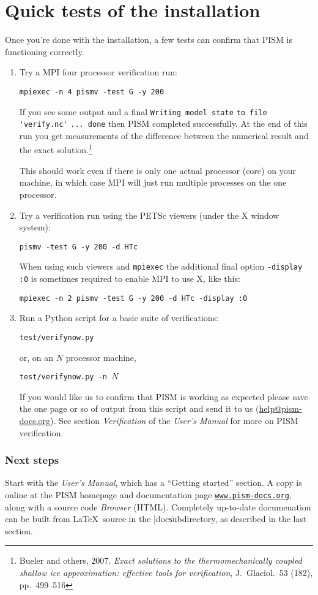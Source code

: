 \documentclass[11pt,final]{amsart}
\renewcommand{\t}[1]{\texttt{#1}}
\begin{document}
\clearpage
\section{Quick tests of the installation}
Once you're done with the installation, a few tests can confirm that PISM is functioning correctly.
\begin{enumerate}
\item Try a MPI four processor verification run:

\verb|mpiexec -n 4 pismv -test G -y 200|

\noindent If you see some output and a final \verb|Writing model state| \verb|to file 'verify.nc'| \verb|... done| then PISM
completed successfully.  At the end of this run you get measurements of the difference between the numerical result and
the exact solution.\footnote{Bueler and others, 2007.  \emph{Exact solutions to the thermomechanically coupled shallow ice approximation: effective tools for verification}, J.~Glaciol.~53 (182), pp.~499--516}

\noindent This should work even if there is only one actual processor (core) on your machine, in which case MPI will just run multiple processes on the one processor.

\item Try a verification run using the PETSc viewers (under the X window system):

\verb|pismv -test G -y 200 -d HTc|

\noindent When using such viewers and \verb|mpiexec| the additional final option \verb|-display :0| is sometimes required to enable MPI to use X, like this:

\verb|mpiexec -n 2 pismv -test G -y 200 -d HTc -display :0|

\item Run a Python script for a basic suite of verifications:

\verb|test/verifynow.py|

\noindent or, on an $N$ processor machine,

\verb|test/verifynow.py -n |$N$

\noindent If you would like us to confirm that PISM is working as expected please save the one page or so of output from this script and send it to us (\href{mailto:help@pism-docs.org}{help@pism-docs.org}).  See section \emph{Verification} of the \emph{User's Manual} for more on PISM verification.
\end{enumerate}

\subsubsection*{Next steps}  Start with the \emph{User's Manual}, which has a ``Getting started'' section.  A copy is online at the PISM homepage and documentation page \href{http://www.pism-docs.org/}{\t{www.pism-docs.org}}, along with a source code \emph{Browser} (HTML).  Completely up-to-date documenation can be built from \LaTeX~source in the |doc\| subdirectory, as described in the last section.
\end{document}

